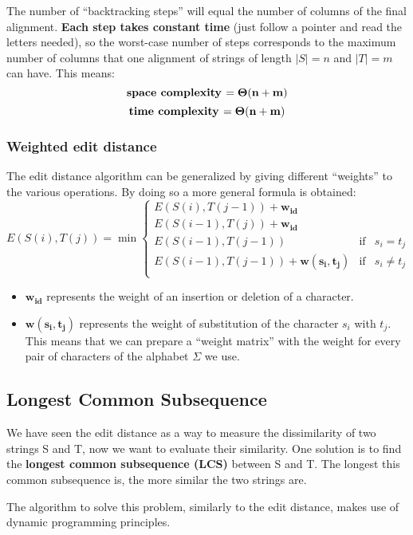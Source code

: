 \documentclass[../main.tex]{subfiles}
\begin{document}
The number of ``backtracking steps'' will equal the number of columns of the final alignment. \textbf{Each step takes constant time} (just follow a pointer and read the letters needed), so the worst-case number of steps corresponds to the maximum number of columns that one alignment of strings of length $|S|=n$ and $|T|=m$ can have. This means:
$$\mbox{\textbf{space complexity }} \mathbf{= \Theta(n+m)}$$
$$\mbox{\textbf{time complexity }} \mathbf{= \Theta(n+m)}$$

\subsubsection{Weighted edit distance}

The edit distance algorithm can be generalized by giving different ``weights'' to the various operations. By doing so a more general formula is obtained:
$$
E(S(i), T(j)) = \min \left\{\begin{array}{rcl}
E(S(i), T(j-1)) + \mathbf{w_{id}} \\ 
E(S(i-1), T(j)) + \mathbf{w_{id}} \\
E(S(i-1), T(j-1)) & \mbox{if} & s_i = t_j \\
E(S(i-1), T(j-1)) + \mathbf{w(s_i, t_j)} & \mbox{if} & s_i \neq t_j \\
\end{array}
\right.
$$
\begin{itemize}
\item $\mathbf{w_{id}}$ represents the weight of an insertion or deletion of a character.
\item $\mathbf{w(s_i, t_j)}$ represents the weight of substitution of the character $s_i$ with $t_j$. This means that we can prepare a ``weight matrix'' with the weight for every pair of characters of the alphabet $\Sigma$ we use.
\end{itemize}

\subsection{Longest Common Subsequence}

We have seen the edit distance as a way to measure the dissimilarity of two strings S and T, now we want to evaluate their similarity. One solution is to find the \textbf{longest common subsequence (LCS)} between S and T. The longest this common subsequence is, the more similar the two strings are.

The algorithm to solve this problem, similarly to the edit distance, makes use of dynamic programming principles.
\end{document}
